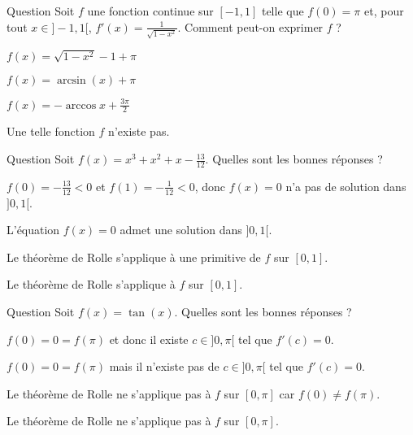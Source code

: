 \begin{multi}{Question}
Soit \(f\) une fonction continue sur \([-1,1]\) telle que \(f(0)=\pi\) et, pour tout \(x\in ]-1,1[\), \(\displaystyle f'(x)=\frac{1}{\sqrt{1-x^2}}\). Comment peut-on exprimer \(f\) ?

    \item \(f(x)=\sqrt{1-x^2}-1+\pi\)
    \item* \(f(x)=\arcsin (x)+\pi\)
    \item* \(\displaystyle f(x)=-\arccos x+\frac{3\pi}{2}\)
    \item Une telle fonction \(f\) n'existe pas.
\end{multi}


\begin{multi}[multiple,feedback=
{Le théorème de Rolle ne s'applique pas à \(f\) sur \([0,1]\) car \(\displaystyle f(0)\neq f(1)\). Mais on peut l'appliquer à 
\[\displaystyle F(x)=\frac{x^4}{4}+\frac{x^3}{3}+\frac{x^2}{2}-\frac{13}{12}x.\]
Cette fonction vérifie toutes les hypothèses du théorème, donc
\[\exists c\in ]0,1[,\; F'(c)=0\Leftrightarrow f(c)=0.\]
}]{Question}
Soit \(\displaystyle f(x)=x^3+x^2+x-\frac{13}{12}\). Quelles sont les bonnes réponses ?

    \item \(\displaystyle f(0)=-\frac{13}{12}<0\) et \(\displaystyle f(1)=-\frac{1}{12}<0\), donc \(f(x)=0\)  n'a pas de solution dans \(]0,1[\).
    \item* L'équation \(f(x)=0\) admet une solution dans \(]0,1[\).
    \item* Le théorème de Rolle s'applique à une primitive de \(f\) sur \([0,1]\).
    \item Le théorème de Rolle s'applique à \(f\) sur \([0,1]\).
\end{multi}


\begin{multi}[multiple,feedback=
{On a bien \(f(0)=0=f(\pi)\). Mais, pour tout \(\displaystyle x\neq \frac{\pi}{2}+k\pi\), \(k\in \Zz\), on a \(f'(x)=1+\tan ^2x>0\). On ne peut appliquer le théorème de Rolle à \(f\) sur \([0,\pi]\) car \(f\) n'est pas définie au point \(\displaystyle \frac{\pi}{2}\).
}]{Question}
Soit \(f(x)=\tan (x)\). Quelles sont les bonnes réponses ?

    \item \(f(0)=0=f(\pi)\) et donc il existe \(c\in ]0,\pi[\) tel que \(f'(c)=0\).
    \item* \(f(0)=0=f(\pi)\) mais il n'existe pas de \(c\in ]0,\pi[\) tel que \(f'(c)=0\).
    \item Le théorème de Rolle ne s'applique pas à \(f\) sur \([0,\pi]\) car \(f(0)\neq f(\pi)\).
    \item* Le théorème de Rolle ne s'applique pas à \(f\) sur \([0,\pi]\).
\end{multi}


